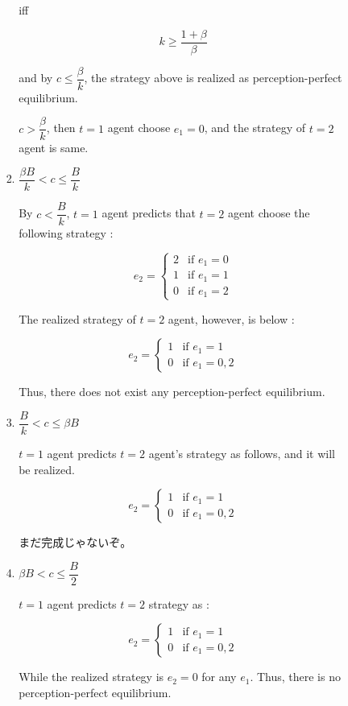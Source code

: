 \documentclass{jsarticle}
\begin{document}
\begin{enumerate}
\begin{enumerate}
\begin{itemize}
\begin{enumerate}
 iff
 
 \[ k \geq \dfrac{1+\beta}{\beta} \]
 
 and by $c \leq \dfrac{\beta}{k}$, the strategy above is realized as perception-perfect equilibrium.
 
 $c > \dfrac{\beta}{k}$, then $t=1$ agent choose $e_1=0$, and the strategy of $t=2$ agent is same.
 
 \item $ \dfrac{\beta B}{k} < c \leq \dfrac{B}{k} $
 
 By $c < \dfrac{B}{k}$, $t=1$ agent predicts that $t=2$ agent choose the following strategy :
 
 \[e_2 = \begin{cases}
 2 & \text{if } e_1=0 \\
 1 & \text{if } e_1=1 \\
 0 & \text{if } e_1=2
 \end{cases} \]
 
 The realized strategy of $t=2$ agent, however, is below :
 
 \[e_2 = \begin{cases}
  1 & \text{if } e_1=1 \\
 0 & \text{if } e_1=0,2
 \end{cases} \]
 
 Thus, there does not exist any perception-perfect equilibrium.
 
 \item $\dfrac{B}{k} < c \leq \beta B$
 
 $t=1$ agent predicts $t=2$ agent's strategy as follows, and it will be realized.
 
  \[e_2 = \begin{cases}
  1 & \text{if } e_1=1 \\
 0 & \text{if } e_1=0,2
 \end{cases} \]
 
 まだ完成じゃないぞ。
 
 \item $\beta B < c \leq \dfrac{B}{2}$
 
 $t=1$ agent predicts $t=2$ strategy as :
 
  \[e_2 = \begin{cases}
  1 & \text{if } e_1=1 \\
 0 & \text{if } e_1=0,2
 \end{cases} \]
 
 While the realized strategy is $e_2=0$ for any $e_1$. Thus, there is no perception-perfect equilibrium.
 

\end{enumerate}
\end{itemize}
\end{enumerate}
\end{enumerate}
\end{document}

